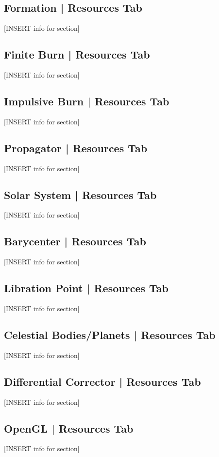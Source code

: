         \subsection{Formation | Resources Tab}
        [INSERT info for section]

        \subsection{Finite Burn | Resources Tab}
        [INSERT info for section]

        \subsection{Impulsive Burn | Resources Tab}
        [INSERT info for section]

        \subsection{Propagator | Resources Tab}
        [INSERT info for section]

        \subsection{Solar System | Resources Tab}
        [INSERT info for section]

        \subsection{Barycenter | Resources Tab}
        [INSERT info for section]

        \subsection{Libration Point | Resources Tab}
        [INSERT info for section]

        \subsection{Celestial Bodies/Planets | Resources Tab}
        [INSERT info for section]

        \subsection{Differential Corrector | Resources Tab}
        [INSERT info for section]

        \subsection{OpenGL | Resources Tab}
        [INSERT info for section]

